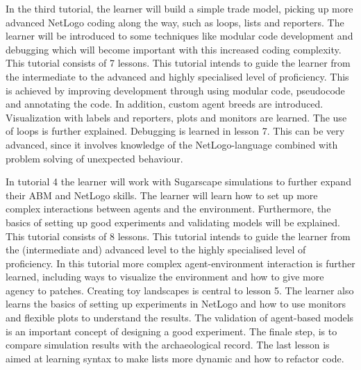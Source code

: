 \documentclass[
]{article}
\begin{document}
In the third tutorial, the learner will build a simple trade model, picking up more advanced NetLogo coding along the way, such as loops, lists and reporters. The learner will be introduced to some techniques like modular code development and debugging which will become important with this increased coding complexity. This tutorial consists of 7 lessons. This tutorial intends to guide the learner from the intermediate to the advanced and highly specialised level of proficiency. This is achieved by improving development through using modular code, pseudocode and annotating the code. In addition, custom agent breeds are introduced. Visualization with labels and reporters, plots and monitors are learned. The use of loops is further explained. Debugging is learned in lesson 7. This can be very advanced, since it involves knowledge of the NetLogo-language combined with problem solving of unexpected behaviour.

In tutorial 4 the learner will work with Sugarscape simulations to further expand their ABM and NetLogo skills. The learner will learn how to set up more complex interactions between agents and the environment. Furthermore, the basics of setting up good experiments and validating models will be explained. This tutorial consists of 8 lessons. This tutorial intends to guide the learner from the (intermediate and) advanced level to the highly specialised level of proficiency. In this tutorial more complex agent-environment interaction is further learned, including ways to visualize the environment and how to give more agency to patches. Creating toy landscapes is central to lesson 5. The learner also learns the basics of setting up experiments in NetLogo and how to use monitors and flexible plots to understand the results. The validation of agent-based models is an important concept of designing a good experiment. The finale step, is to compare simulation results with the archaeological record. The last lesson is aimed at learning syntax to make lists more dynamic and how to refactor code.
\end{document}
